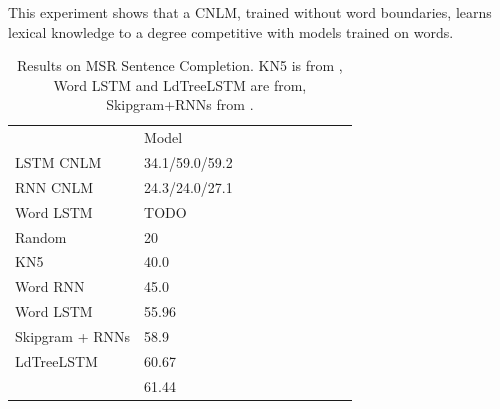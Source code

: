 This experiment shows that a CNLM, trained without word boundaries, learns lexical knowledge to a degree competitive with models trained on words.

\begin{table}[t]
  \begin{center}
    \begin{tabular}{l|l|l|l|llllll}
      \multicolumn{1}{c}{}& Model \\
LSTM CNLM	    &      34.1/59.0/59.2 \\
	    RNN CNLM &     24.3/24.0/27.1 \\
	    Word LSTM & TODO \\ \hline
	    Random & 20 \\
	    KN5   & 40.0 \\
            Word RNN & 45.0 \\
	    Word LSTM  & 55.96 \\
Skipgram + RNNs  & 58.9 \\
LdTreeLSTM  & 60.67 \\
            \citet{woods2016exploiting} &  61.44 \\
    \end{tabular}
  \end{center}
  \caption{\label{tab:msr-completion-results} Results on MSR Sentence Completion. KN5 is from \cite{Mikolov:2012}, Word LSTM and LdTreeLSTM are from\cite{zhang2016top}, Skipgram+RNNs from \cite{Mikolov:etal:2013b}.}
\end{table}




